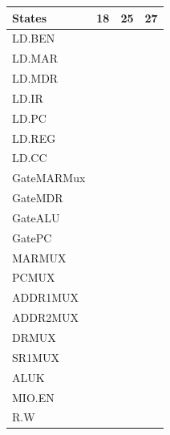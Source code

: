 \documentclass{article}
\begin{document}
\begin{enumerate}[label=(\alph*), itemsep = 120pt]
        \begin{table}[h]
            \centering
            \begin{tabular}{|>{\centering\arraybackslash}p{2.5cm}|>{\centering\arraybackslash}p{2.5cm}|>{\centering\arraybackslash}p{2.5cm}|>{\centering\arraybackslash}p{2.5cm}|}
            \hline
            \textbf{States} & \textbf{18} & \textbf{25} & \textbf{27} \\
            \hline
            LD.BEN & & & \\
            \hline
            LD.MAR & & & \\
            \hline
            LD.MDR & & & \\
            \hline
            LD.IR & & & \\
            \hline
            LD.PC & & & \\
            \hline
            LD.REG & & & \\
            \hline
            LD.CC & & & \\
            \hline
            GateMARMux & & & \\
            \hline
            GateMDR & & & \\
            \hline
            GateALU & & & \\
            \hline
            GatePC & & & \\
            \hline
            MARMUX & & & \\
            \hline
            PCMUX & & & \\
            \hline
            ADDR1MUX & & & \\
            \hline
            ADDR2MUX & & & \\
            \hline
            DRMUX & & & \\
            \hline
            SR1MUX & & & \\
            \hline
            ALUK & & & \\
            \hline
            MIO.EN & & & \\
            \hline
            R.W & & & \\
            \hline
            \end{tabular}
            \label{tab:modified}

        \end{table}
    \end{enumerate}
     \newpage
\end{document}
